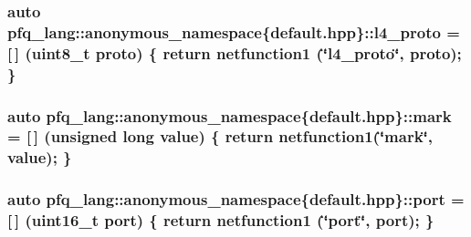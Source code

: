 \hypertarget{namespacepfq__lang_1_1anonymous__namespace_02default_8hpp_03_a75da77904f1cff4cc42fc3a081f80670}{
\subsubsection[{l4\-\_\-proto}]{\setlength{\rightskip}{0pt plus 5cm}auto pfq\-\_\-lang\-::anonymous\-\_\-namespace\{default.\-hpp\}\-::l4\-\_\-proto = \mbox{[}$\,$\mbox{]} (uint8\-\_\-t proto) \{ return {\bf netfunction1} (\char`\"{}l4\-\_\-proto\char`\"{}, proto); \}}}\label{namespacepfq__lang_1_1anonymous__namespace_02default_8hpp_03_a75da77904f1cff4cc42fc3a081f80670}
\hypertarget{namespacepfq__lang_1_1anonymous__namespace_02default_8hpp_03_ad6142fe3a0fc859f25ea16956f52a5f0}{
\subsubsection[{mark}]{\setlength{\rightskip}{0pt plus 5cm}auto pfq\-\_\-lang\-::anonymous\-\_\-namespace\{default.\-hpp\}\-::mark = \mbox{[}$\,$\mbox{]} (unsigned long value) \{ return {\bf netfunction1}(\char`\"{}mark\char`\"{}, value); \}}}\label{namespacepfq__lang_1_1anonymous__namespace_02default_8hpp_03_ad6142fe3a0fc859f25ea16956f52a5f0}
\hypertarget{namespacepfq__lang_1_1anonymous__namespace_02default_8hpp_03_a1b370b44e5eedc364f3bb306d5042738}{
\subsubsection[{port}]{\setlength{\rightskip}{0pt plus 5cm}auto pfq\-\_\-lang\-::anonymous\-\_\-namespace\{default.\-hpp\}\-::port = \mbox{[}$\,$\mbox{]} (uint16\-\_\-t port) \{ return {\bf netfunction1} (\char`\"{}port\char`\"{}, port); \}}}\label{namespacepfq__lang_1_1anonymous__namespace_02default_8hpp_03_a1b370b44e5eedc364f3bb306d5042738}
